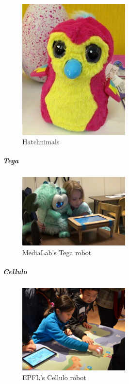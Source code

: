\documentclass[]{article}
\let\oldsubparagraph\subparagraph
\renewcommand{\subparagraph}[1]{\oldsubparagraph{#1}\mbox{}}
\begin{document}
\begin{figure}
\centering
\includegraphics[width=0.5\textwidth,height=\textheight]{figs/hatchnimals.jpg}
\caption{Hatchnimals}
\end{figure}

\hypertarget{tega}{%
\subparagraph{Tega}\label{tega}}

\begin{figure}
\centering
\includegraphics[width=0.5\textwidth,height=\textheight]{figs/tega.jpg}
\caption{MediaLab's Tega robot}
\end{figure}

\hypertarget{cellulo}{%
\subparagraph{Cellulo}\label{cellulo}}

\begin{figure}
\centering
\includegraphics[width=0.5\textwidth,height=\textheight]{figs/cellulo.jpg}
\caption{EPFL's Cellulo robot}
\end{figure}
\end{document}
